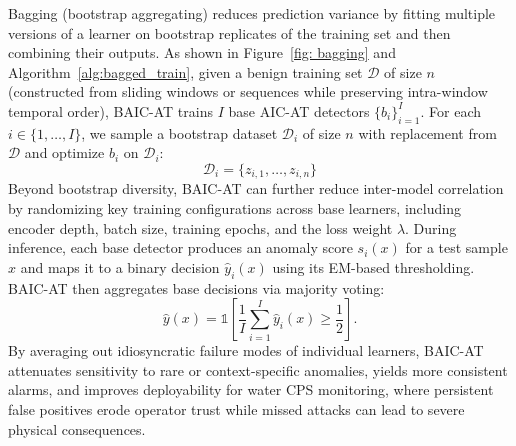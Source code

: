 \documentclass[pdflatex,sn-mathphys-num]{sn-jnl}%
\theoremstyle{thmstyleone}
\theoremstyle{thmstyletwo}%
\theoremstyle{thmstylethree}%
\begin{document}
Bagging (bootstrap aggregating) reduces prediction variance by fitting multiple versions of a learner on bootstrap replicates of the training set and then combining their outputs. As shown in Figure~\ref{fig: bagging} and Algorithm~\ref{alg:bagged_train}, given a benign training set $\mathcal{D}$ of size $n$ (constructed from sliding windows or sequences while preserving intra-window temporal order), BAIC-AT trains $I$ base AIC-AT detectors $\{b_i\}_{i=1}^{I}$. For each $i\in\{1,\dots,I\}$, we sample a bootstrap dataset $\mathcal{D}_i$ of size $n$ with replacement from $\mathcal{D}$ and optimize $b_i$ on $\mathcal{D}_i$:
\begin{equation}
\mathcal{D}_i=\{z_{i,1},\dots,z_{i,n}\}
\end{equation}
Beyond bootstrap diversity, BAIC-AT can further reduce inter-model correlation by randomizing key training configurations across base learners, including encoder depth, batch size, training epochs, and the loss weight $\lambda$. During inference, each base detector produces an anomaly score $s_i(x)$ for a test sample $x$ and maps it to a binary decision $\hat{y}_i(x)$ using its EM-based thresholding. BAIC-AT then aggregates base decisions via majority voting:
\begin{equation}
\hat{y}(x)=\mathbb{1}\!\left[\frac{1}{I}\sum_{i=1}^{I}\hat{y}_i(x)\ge \frac{1}{2}\right].
\end{equation}
By averaging out idiosyncratic failure modes of individual learners, BAIC-AT attenuates sensitivity to rare or context-specific anomalies, yields more consistent alarms, and improves deployability for water CPS monitoring, where persistent false positives erode operator trust while missed attacks can lead to severe physical consequences.

\begin{algorithm}[t]
    \caption{BAIC-AT Training}\label{alg:bagged_train}
    \DontPrintSemicolon
    
\end{algorithm}
\end{document}
